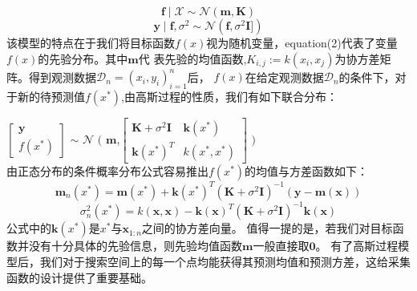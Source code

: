 \documentclass[a4paper,10pt]{article}
\begin{document}
\begin{equation}\label{eq1}
    \textbf{f}\mid\mathcal{X} \sim \mathcal{N}(\textbf{m},\textbf{K})
    \end{equation}
    \begin{equation}\label{eq1}
    \textbf{y}\mid \textbf{f},\sigma^2 \sim \mathcal{N}(\textbf{f},\sigma^2\textbf{I}])
    \end{equation}
该模型的特点在于我们将目标函数$f(x)$视为随机变量，equation(2)代表了变量$f(x)$的先验分布。其中$\textbf{m}$代
表先验的均值函数,$K_{i,j}:=k(x_i,x_j)$为协方差矩阵。得到观测数据$\mathcal{D}_n={(x_i,y_i)^n_{i=1}}$后，
$f(x)$在给定观测数据$\mathcal{D}_n$的条件下，对于新的待预测值$f(x^*)$,由高斯过程的性质，我们有如下联合分布：

\hspace*{\fill}

\qquad \qquad \qquad \quad  $\begin{bmatrix} \textbf{y} \\ f(x^*) \end{bmatrix}$ $\sim$ 
$\mathcal{N}$ $\Biggl($ $\textbf{m}$,$\begin{bmatrix} \textbf{K}+\sigma^2\textbf{I} & \textbf{k} (x^*)\\ 
\textbf{k} (x^*)^T & k(x^*,x^*) \end{bmatrix}$ $\Biggl)$\\
 由正态分布的条件概率分布公式容易推出$f(x^*)$的均值与方差函数如下：
\begin{equation}\label{eq1}
\textbf{m}_n(x^*)=\textbf{m}(x^*)+\textbf{k}(x^*)^T(\textbf{K}+\sigma^2\textbf{I})^{-1}(\textbf{y}-\textbf{m}(\textbf{x}))
\end{equation}
\begin{equation}\label{eq1}
\sigma^2_n(x^*)=k(\textbf{x},\textbf{x})-\textbf{k}(\textbf{x})^T(\textbf{K}+\sigma^2\textbf{I})^{-1} \textbf{k}(\textbf{x})
\end{equation}
公式中的$\textbf{k}(x^*)$是$x^*$与$\textbf{x}_{1:n}$之间的协方差向量。
值得一提的是，若我们对目标函数并没有十分具体的先验信息，则先验均值函数$\textbf{m}$一般直接取$\textbf{0}$。
有了高斯过程模型后，我们对于搜索空间上的每一个点均能获得其预测均值和预测方差，这给采集函数的设计提供了重要基础。
\end{document}
